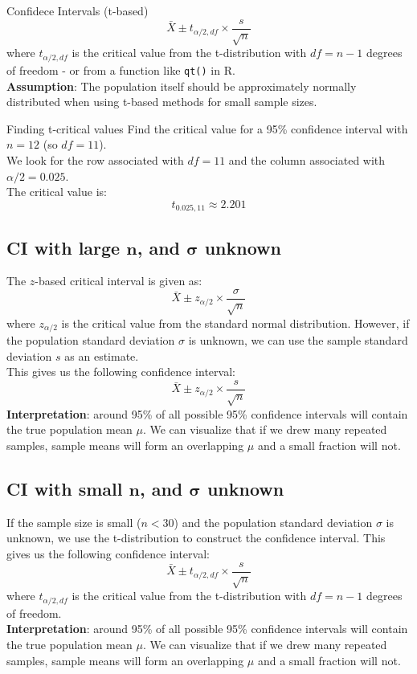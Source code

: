 \documentclass[9pt]{extarticle}
\begin{document}
\vfill
\begin{definitionbox}{Confidece Intervals (t-based)}{}
    $$\bar{X} \pm t_{\alpha/2, df} \times \frac{s}{\sqrt{n}}$$
    where $t_{\alpha/2, df}$ is the critical value from the t-distribution with $df = n - 1$ degrees of freedom - or from a function like \texttt{qt()} in R.\\

    \textbf{Assumption}: The population itself should be approximately normally distributed when using t-based methods for small sample sizes.
\end{definitionbox}
\vfill
\begin{examplebox}{Finding t-critical values}{}
    Find the critical value for a 95\% confidence interval with $n = 12$ (so $df = 11$).\\
    We look for the row associated with $df = 11$ and the column associated with $\alpha/2 = 0.025$.\\
    The critical value is:
    $$t_{0.025, 11} \approx 2.201$$
\end{examplebox}
\pagebreak
\subsection{CI with large $\boldsymbol{n}$, and $\boldsymbol{\sigma}$ unknown}
The $z$-based critical interval is given as:
$$\bar{X} \pm z_{\alpha/2} \times \frac{\sigma}{\sqrt{n}}$$
where $z_{\alpha/2}$ is the critical value from the standard normal distribution.
However, if the population standard deviation $\sigma$ is unknown, we can use the sample standard deviation $s$ as an estimate.\\
This gives us the following confidence interval:
$$\bar{X} \pm z_{\alpha/2} \times \frac{s}{\sqrt{n}}$$
\textbf{Interpretation}: around 95\% of all possible 95\% confidence intervals will contain the true population mean $\mu$. We can visualize that if we drew many repeated samples, sample means will form an overlapping $\mu$ and a small fraction will not.

\subsection{CI with small $\boldsymbol{n}$, and $\boldsymbol{\sigma}$ unknown}
If the sample size is small ($n < 30$) and the population standard deviation $\sigma$ is unknown, we use the t-distribution to construct the confidence interval. This gives us the following confidence interval:
$$\bar{X} \pm t_{\alpha/2, df} \times \frac{s}{\sqrt{n}}$$
where $t_{\alpha/2, df}$ is the critical value from the t-distribution with $df = n - 1$ degrees of freedom.\\
\textbf{Interpretation}: around 95\% of all possible 95\% confidence intervals will contain the true population mean $\mu$. We can visualize that if we drew many repeated samples, sample means will form an overlapping $\mu$ and a small fraction will not.
\end{document}
